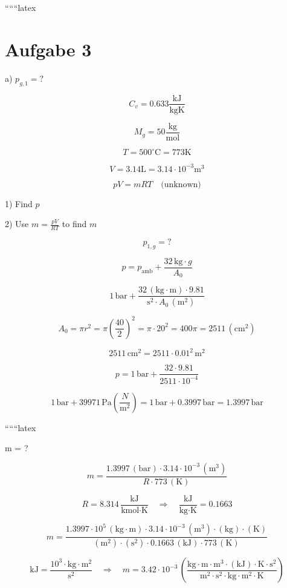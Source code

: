 
``````latex


\section*{Aufgabe 3}

a) $p_{g,1} = ?$

\[
C_v = 0.633 \frac{\text{kJ}}{\text{kgK}}
\]

\[
M_g = 50 \frac{\text{kg}}{\text{mol}}
\]

\[
T = 500^\circ \text{C} = 773 \text{K}
\]

\[
V = 3.14 \text{L} = 3.14 \cdot 10^{-3} \text{m}^3
\]

\[
pV = mRT \quad \text{(unknown)}
\]

1) Find $p$

2) Use $m = \frac{pV}{RT}$ to find $m$

\[
p_{1,g} = ?
\]

\[
p = p_{\text{amb}} + \frac{32 \, \text{kg} \cdot g}{A_0}
\]

\[
1 \, \text{bar} + \frac{32 \, (\text{kg} \cdot \text{m}) \cdot 9.81}{\text{s}^2 \cdot A_0 \, (\text{m}^2)}
\]

\[
A_0 = \pi r^2 = \pi \left(\frac{40}{2}\right)^2 = \pi \cdot 20^2 = 400 \pi = 2511 \, (\text{cm}^2)
\]

\[
2511 \, \text{cm}^2 = 2511 \cdot 0.01^2 \, \text{m}^2
\]

\[
p = 1 \, \text{bar} + \frac{32 \cdot 9.81}{2511 \cdot 10^{-4}}
\]

\[
1 \, \text{bar} + 39971 \, \text{Pa} \left(\frac{N}{\text{m}^2}\right) = 1 \, \text{bar} + 0.3997 \, \text{bar} = 1.3997 \, \text{bar}
\]

``````latex


m = ?

\[
m = \frac{1.3997 \, (\text{bar}) \cdot 3.14 \cdot 10^{-3} \, (\text{m}^3)}{R \cdot 773 \, (\text{K})}
\]

\[
R = 8.314 \, \frac{\text{kJ}}{\text{kmol} \cdot \text{K}} \quad \Rightarrow \quad \frac{\text{kJ}}{\text{kg} \cdot \text{K}} = 0.1663
\]

\[
m = \frac{1.3997 \cdot 10^5 \, (\text{kg} \cdot \text{m}) \cdot 3.14 \cdot 10^{-3} \, (\text{m}^3) \cdot (\text{kg}) \cdot (\text{K})}{(\text{m}^2) \cdot (\text{s}^2) \cdot 0.1663 \, (\text{kJ}) \cdot 773 \, (\text{K})}
\]

\[
\text{kJ} = \frac{10^3 \cdot \text{kg} \cdot \text{m}^2}{\text{s}^2} \quad \Rightarrow \quad m = 3.42 \cdot 10^{-3} \, \left( \frac{\text{kg} \cdot \text{m} \cdot \text{m}^3 \cdot (\text{kJ}) \cdot \text{K} \cdot \text{s}^2}{\text{m}^2 \cdot \text{s}^2 \cdot \text{kg} \cdot \text{m}^2 \cdot \text{K}} \right)
\]

